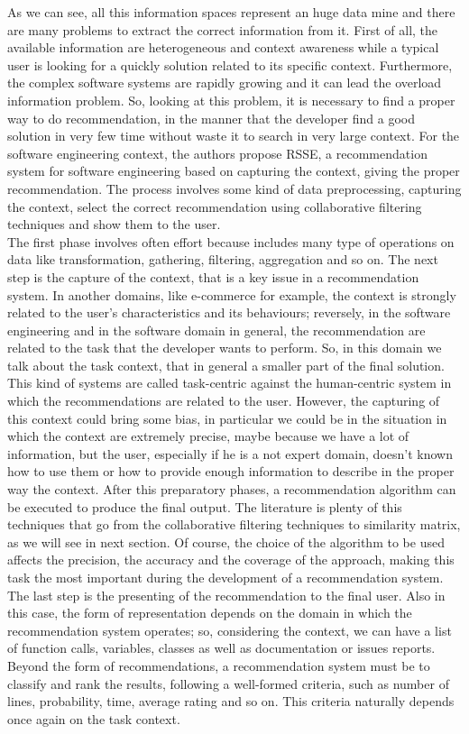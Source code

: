 As we can see, all this information spaces represent an huge data mine and there are many problems to extract the correct information from it. First of all, the available information are heterogeneous and context awareness while a typical user is looking for a quickly solution related to its specific context. Furthermore, the complex software systems are rapidly growing and it can lead the overload information problem. So, looking at this problem, it is necessary to find a proper way to do recommendation, in the manner that the developer find a good solution in very few time without waste it to search in very large context. For the software engineering context, the authors propose RSSE, a recommendation system for software engineering based on capturing the context, giving the proper recommendation. The process involves some kind of data preprocessing, capturing the context, select the correct recommendation using collaborative filtering techniques and show them to the user.\\
 The first phase involves often effort because includes many type of operations on data like transformation, gathering, filtering, aggregation and so on. The next step is the capture of the context, that is a key issue in a recommendation system. In another domains, like e-commerce for example, the context is strongly related to the user's characteristics and its behaviours; reversely, in the software engineering and in the software domain in general, the recommendation are related to the task that the developer wants to perform. So, in this domain we talk about the task context, that in general a smaller part of the final solution. This kind of systems are called task-centric against the human-centric system in which the recommendations are related to the user. However, the capturing of this context could bring some bias, in particular we could be in the situation in which the context are extremely precise, maybe because we have a lot of information, but the user, especially if he is a not expert domain, doesn't known how to use them or how to provide enough information to describe in the proper way the context. After this preparatory phases, a recommendation algorithm can be executed to produce the final output. The literature is plenty of this techniques that go from the collaborative filtering techniques to similarity matrix, as we will see in next section. Of course, the choice of the algorithm to be used affects the precision, the accuracy and the coverage of the approach, making this task the most important during the development of a recommendation system. The last step is the presenting of the recommendation to the final user. Also in this case, the form of representation depends on the domain in which the recommendation system operates; so, considering the context, we can have a list of function calls, variables, classes as well as documentation or issues reports. Beyond the form of recommendations, a recommendation system must be to classify and rank the results, following a well-formed criteria, such as number of lines, probability, time, average rating and so on. This criteria naturally depends once again on the task context. \newline
